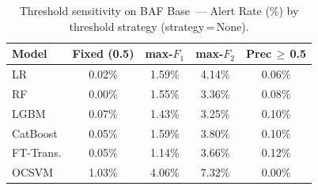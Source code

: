 \begin{table}[ht!]
\centering
\caption{Threshold sensitivity on BAF Base~--- Alert Rate (\%) by threshold strategy (strategy\,=\,None).}
\label{tab:threshold_baf_alert}
\begin{tabular}{l c c c c}
\toprule
Model & Fixed (0.5) & max-$F_1$ & max-$F_2$ & Prec\,$\geq$\,0.5 \\
\midrule
LR         & 0.02\% & 1.59\% & 4.14\% & 0.06\% \\
RF         & 0.00\% & 1.55\% & 3.36\% & 0.08\% \\
LGBM       & 0.07\% & 1.43\% & 3.25\% & 0.10\% \\
CatBoost   & 0.05\% & 1.59\% & 3.80\% & 0.10\% \\
FT-Trans.  & 0.05\% & 1.14\% & 3.66\% & 0.12\% \\
OCSVM      & 1.03\% & 4.06\% & 7.32\% & 0.00\% \\
\bottomrule
\end{tabular}
\end{table}